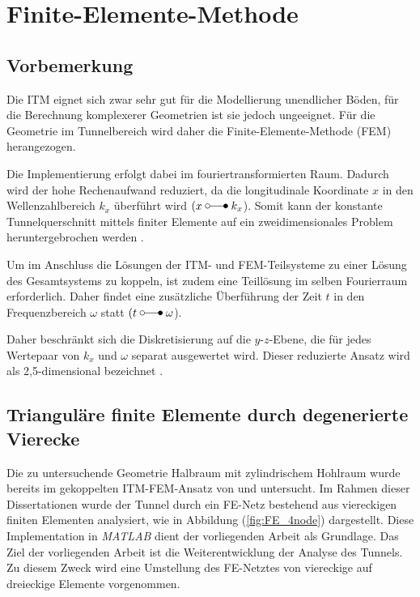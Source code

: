 \chapter{Finite-Elemente-Methode}
\label{cha:FEM}

\section{Vorbemerkung}
\label{sec:FEM_Vorbemerkung}

Die ITM eignet sich zwar sehr gut für die Modellierung unendlicher Böden, für die Berechnung komplexerer Geometrien ist sie jedoch ungeeignet. Für die Geometrie im Tunnelbereich wird daher die Finite-Elemente-Methode (FEM) herangezogen.

Die Implementierung erfolgt dabei im fouriertransformierten Raum.
Dadurch wird der hohe Rechenaufwand reduziert, da die longitudinale Koordinate $x$ in den Wellenzahlbereich $k_x$ überführt wird \((x \mapto k_x\)). 
Somit kann der konstante Tunnelquerschnitt mittels finiter Elemente auf ein zweidimensionales Problem heruntergebrochen werden \citep{Fruehe2010}. 

Um im Anschluss die Lösungen der ITM- und FEM-Teilsysteme zu einer Lösung des Gesamtsystems zu koppeln, ist zudem eine Teillösung im selben Fourierraum erforderlich. 
Daher findet eine zusätzliche Überführung der Zeit $t$ in den Frequenzbereich $\omega$ statt \((t \mapto \omega\)). 

Daher beschränkt sich die Diskretisierung auf die $y$-$z$-Ebene, die für jedes Wertepaar von $k_x$ und $\omega$ separat ausgewertet wird. 
Dieser reduzierte Ansatz wird als 2,5-dimensional bezeichnet \citep{Freisinger_Hackenberg2020}. 


\section{Trianguläre finite Elemente durch degenerierte Vierecke}
\label{sec:degenerierte Dreiecke}

Die zu untersuchende Geometrie Halbraum mit zylindrischem Hohlraum wurde bereits im gekoppelten ITM-FEM-Ansatz von \cite{Hackenberg2016} und \cite{Freisinger2022} untersucht.
Im Rahmen dieser Dissertationen wurde der Tunnel durch ein FE-Netz bestehend aus viereckigen finiten Elementen analysiert, wie in Abbildung (\ref{fig:FE_4node}) dargestellt.
Diese Implementation in \emph{MATLAB\texttrademark} dient der vorliegenden Arbeit als Grundlage.
Das Ziel der vorliegenden Arbeit ist die Weiterentwicklung der Analyse des Tunnels. Zu diesem Zweck wird eine Umstellung des FE-Netztes von viereckige auf dreieckige Elemente vorgenommen.

